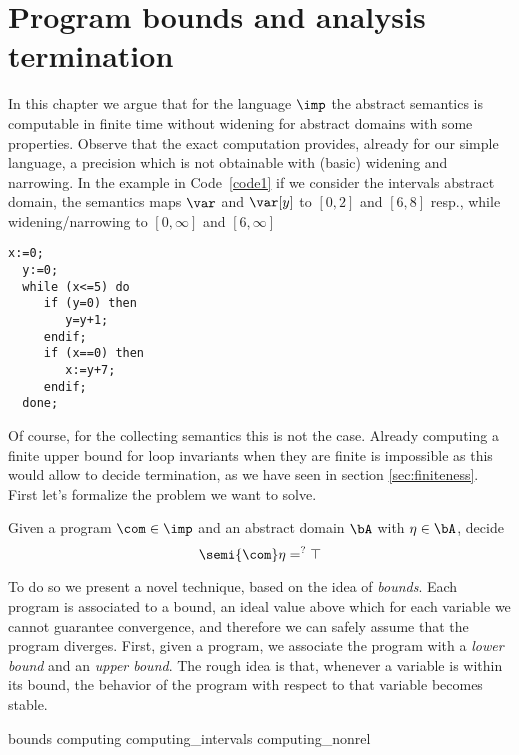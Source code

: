 \chapter{Program bounds and analysis termination}
\label{chap:axiomatized}


In this chapter we argue that for the language \(\imp\) the abstract
semantics is computable in finite time without widening for abstract
domains with some properties.  Observe that the exact computation
provides, already for our simple language, a precision which is not
obtainable with (basic) widening and narrowing. In the example in
Code~\ref{code1} if we consider the intervals abstract domain, the
semantics maps \(\var\) and \(\var[y]\) to \([0,2]\) and \([6,8]\)
resp., while widening/narrowing to \([0,\infty]\) and \([6,\infty]\)

\begin{lstlisting}[caption=Code sample where analysis of
  \(\fix{\com}\) is less precise than \(\com^*\), label=code1,
  language=Imp]
  x:=0;
  y:=0;
  while (x<=5) do
     if (y=0) then
        y=y+1;
     endif;
     if (x==0) then
        x:=y+7;
     endif;
  done;
\end{lstlisting}

Of course, for the collecting semantics this is not the case. Already
computing a finite upper bound for loop invariants when they are
finite is impossible as this would allow to decide termination, as we
have seen in section \ref{sec:finiteness}. First let's formalize the
problem we want to solve.

\begin{problem}\label{problem1}
  Given a program \(\com\in \imp\) and an abstract domain \(\bA\) with
  \(\eta \in \bA\), decide
  \begin{equation*}
    \semi{\com} \eta =^? \top
  \end{equation*}
\end{problem}

To do so we present a novel technique, based on the idea of
\emph{bounds}. Each program is associated to a bound, an ideal value
above which for each variable we cannot guarantee convergence, and
therefore we can safely assume that the program diverges.  First,
given a program, we associate the program with a \emph{lower bound}
and an \emph{upper bound}. The rough idea is that, whenever a variable
is within its bound, the behavior of the program with respect to that
variable becomes stable. %

{bounds}
{computing}
{computing_intervals}
{computing_nonrel}
